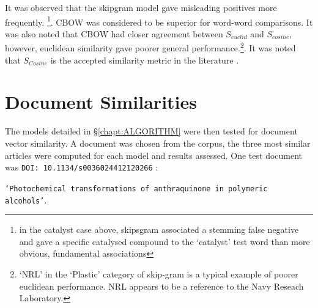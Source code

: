 It was observed that the skipgram model gave misleading positives more frequently. \footnote{in the catalyst case above, skipsgram associated a stemming false negative and gave a specific catalysed compound to the `catalyst' test word than more obvious, fundamental associations}. CBOW  was considered to be superior for word-word comparisons. It was also noted that CBOW had closer agreement between $S_{euclid}$ and $S_{cosine}$, however, euclidean similarity gave poorer general performance.\footnote{`NRL' in the `Plastic' category of skip-gram is a typical example of poorer euclidean performance. NRL appears to be a reference to the Navy Reseach Laboratory. }. It was noted that $S_{Cosine}$ is the accepted similarity metric in the literature \cite{word2vec1} \cite{word2vec2} \cite{doc2vec}.

\section{Document Similarities}
The models detailed in \S\ref{chapt:ALGORITHM} were then tested for document vector similarity. A document was chosen from the corpus, the three most similar articles were computed for each model and results assessed. One test document was \texttt{DOI: 10.1134/s0036024412120266} \cite{docassay}:


\texttt{`Photochemical transformations of anthraquinone in polymeric alcohols'}.

